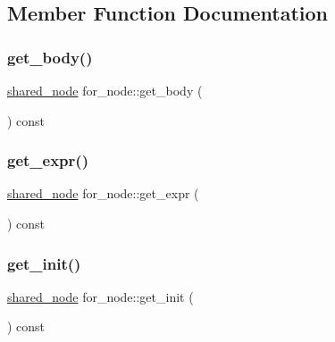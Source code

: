 \subsection{Member Function Documentation}
\mbox{\label{classjawe_1_1for__node_a486a5ec435ae87654f63dd2fdca55093}} 
\subsubsection{\texorpdfstring{get\+\_\+body()}{get\_body()}}
{\footnotesize\ttfamily \hyperlink{namespacejawe_a3f307481d921b6cbb50cc8511fc2b544}{shared\+\_\+node} for\+\_\+node\+::get\+\_\+body (\begin{DoxyParamCaption}{ }\end{DoxyParamCaption}) const}

\mbox{\label{classjawe_1_1for__node_a5717876344a01dc22d0601f082f014e4}} 
\subsubsection{\texorpdfstring{get\+\_\+expr()}{get\_expr()}}
{\footnotesize\ttfamily \hyperlink{namespacejawe_a3f307481d921b6cbb50cc8511fc2b544}{shared\+\_\+node} for\+\_\+node\+::get\+\_\+expr (\begin{DoxyParamCaption}{ }\end{DoxyParamCaption}) const}

\mbox{\label{classjawe_1_1for__node_af47b420f615e83103dc1035a76324db6}} 
\subsubsection{\texorpdfstring{get\+\_\+init()}{get\_init()}}
{\footnotesize\ttfamily \hyperlink{namespacejawe_a3f307481d921b6cbb50cc8511fc2b544}{shared\+\_\+node} for\+\_\+node\+::get\+\_\+init (\begin{DoxyParamCaption}{ }\end{DoxyParamCaption}) const}

